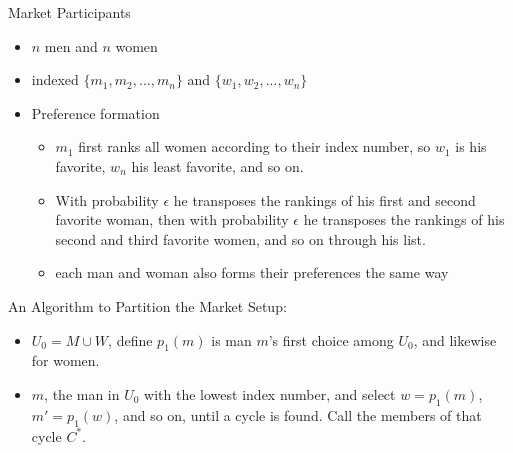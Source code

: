 \documentclass{beamer}
\begin{document}
\begin{frame}{Market Participants}
	
\begin{itemize}
	\item $n$ men and $n$ women
	\item indexed $\{ m_1, m_2, ... ,m_n\}$ and $\{ w_1, w_2, ... ,w_n\}$
	\item Preference formation
	\begin{itemize}
		\item $m_1$ first ranks all women according to their index number, so $w_1$ is his favorite, $w_n$ his least favorite, and so on.  
		\item With probability $\epsilon$ he transposes the rankings of his first and second favorite woman, then with probability $\epsilon$ he transposes the rankings of his second and third favorite women, and so on through his list.
		\item each man and woman also forms their preferences the same way
	\end{itemize}
\end{itemize}
\end{frame}

 \begin{frame}{An Algorithm to Partition the Market}
 	Setup: 
 	\begin{itemize}
 		\item 	$U_0 = M \cup W$, define $p_1(m)$ is man $m$'s first choice among $U_0$, and likewise for women.
 		\item  $m$, the man in $U_0$ with the lowest index number, and select $w = p_1(m)$, $m' = p_1(w)$, and so on, until a cycle is found. Call the members of that cycle $C^*$.  
 	\end{itemize}
 
  \end{frame}
\end{document}
